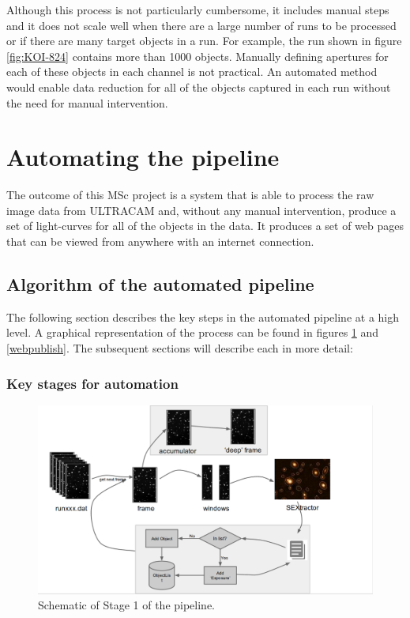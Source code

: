 Although this process is not particularly cumbersome, it includes manual steps and it does not scale well when there are a large number of runs to be processed or if there are many target objects in a run. For example, the run shown in figure \ref{fig:KOI-824} contains more than 1000 objects. Manually defining apertures for each of these objects in each channel is not practical. An automated method would enable data reduction for all of the objects captured in each run without the need for manual intervention. 

\section{Automating the pipeline}
The outcome of this MSc project is a system that is able to process the raw image data from ULTRACAM and, without any manual intervention, produce a set of light-curves for all of the objects in the data. It produces a set of web pages that can be viewed from anywhere with an internet connection. 

\subsection{Algorithm of the automated pipeline} 
The following section describes the key steps in the automated pipeline at a high level. A graphical representation of the process can be found in figures \ref{flowchart} and \ref{webpublish}. The subsequent sections will describe each in more detail:

\subsubsection{Key stages for automation}

\begin{figure}
	\centering
	\includegraphics[width=130mm]{images/flowchart.png}
	\caption{Schematic of Stage 1 of the pipeline.}
	\label{flowchart}
\end{figure}


